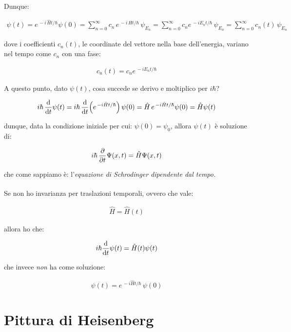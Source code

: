 	Dunque:

\begin{align*}
	\psi(t) = e^{\, - i \, \hat{H} t/ \hbar} \psi(0) = \sum_{n = 0}^{\infty} c_n \, e^{\, - i \, \hat{H} t/ \hbar} \,\psi_{E_n} = \sum_{n = 0}^{\infty} c_n e^{\, - i E_n t /\hbar} \, \psi_{E_n} = \sum_{n = 0}^{\infty} c_n(t) \, \psi_{E_n}
\end{align*}

	dove i coefficienti $c_n(t)$, le coordinate del vettore nella base dell'energia, variano nel tempo come $c_n$ con una fase:
	
\begin{align*}
	c_n(t) = c_n e^{\, - i E_n t /\hbar}
\end{align*}

	A questo punto, dato $\psi(t)$, cosa succede se derivo e moltiplico per $i\hbar$?
	
\begin{align*}
	i\hbar \, \dv{t} \psi(t) = i \hbar \,\dv{t} \qty(e^{\, - i \hat{H} t /\hbar}) \, \psi(0) = \hat{H} \, e^{\, - i\hat{H}t / \hbar} \psi(0) = \hat{H} \psi(t) 
\end{align*}

	dunque, data la condizione iniziale per cui: $\psi(0) = \psi_0$, allora $\psi(t)$ è soluzione di:
	
\begin{align*}
	i\hbar \, \pdv{t} \Psi(x, t) = \hat{H}\Psi(x, t)
\end{align*}

	che come sappiamo è: l'\textit{equazione di Schrodinger dipendente dal tempo.}
	\\
	\\
	Se non ho invarianza per traslazioni temporali, ovvero che vale:

\begin{align*}
	\hat{H} = \hat{H}(t)
\end{align*}

	allora ho che:

\begin{align*}
	i\hbar \dv{t}\psi(t) = \hat{H}(t) \psi(t) 
\end{align*}

	che invece \textit{non} ha come soluzione:
	
\begin{align*}
	\psi(t) =  e^{\, - i \hat{H} t /\hbar} \, \psi(0) 
\end{align*}

\section{Pittura di Heisenberg}


